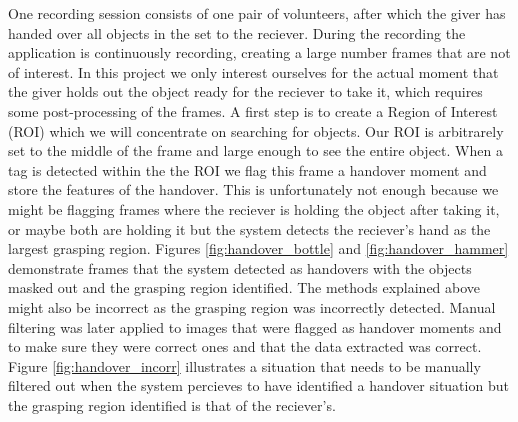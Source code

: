 One recording session consists of one pair of volunteers, after which the giver has handed over all objects in the set to the reciever. During the recording the application is continuously recording, creating a large number frames that are not of interest. In this project we only interest ourselves for the actual moment that the giver holds out the object ready for the reciever to take it, which requires some post-processing of the frames. A first step is to create a Region of Interest (ROI) which we will concentrate on searching for objects. Our ROI is arbitrarely set to the middle of the frame and large enough to see the entire object. When a tag is detected within the the ROI we flag this frame a handover moment and store the features of the handover. This is unfortunately not enough because we might be flagging frames where the reciever is holding the object after taking it, or maybe both are holding it but the system detects the reciever's hand as the largest grasping region. Figures \ref{fig:handover_bottle} and \ref{fig:handover_hammer} demonstrate frames that the system detected as handovers with the objects masked out and the grasping region identified. The methods explained above might also be incorrect as the grasping region was incorrectly detected. Manual filtering was later applied to images that were flagged as handover moments and to make sure they were correct ones and that the data extracted was correct. Figure \ref{fig:handover_incorr} illustrates a situation that needs to be manually filtered out when the system percieves to have identified a handover situation but the grasping region identified is that of the reciever's.

